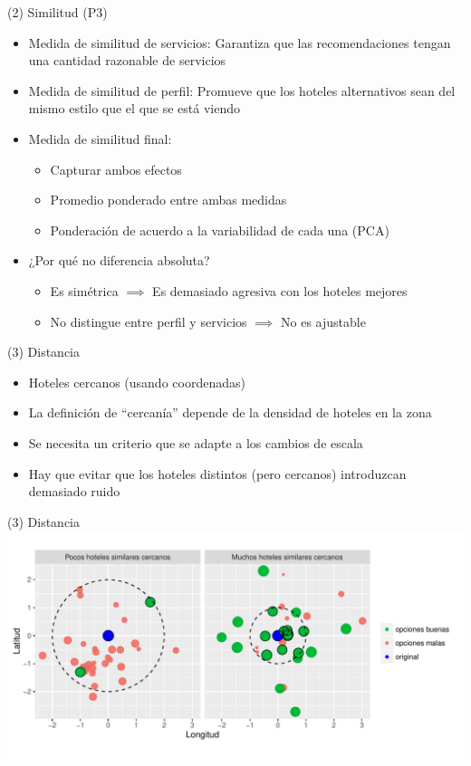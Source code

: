 \documentclass{beamer}
\begin{document}
\begin{frame}{(2) Similitud (P3)}
	\begin{itemize}%
		\item Medida de similitud de servicios: Garantiza que las recomendaciones tengan una cantidad razonable de servicios
		\item Medida de similitud de perfil: Promueve que los hoteles alternativos sean del mismo estilo que el que se está viendo
		\item Medida de similitud final:
		\begin{itemize}
			\item Capturar ambos efectos
			\item Promedio ponderado entre ambas medidas
			\item Ponderación de acuerdo a la variabilidad de cada una (PCA)
		\end{itemize}
		\item ¿Por qué no diferencia absoluta?
		\begin{itemize}
			\item Es simétrica $\implies$ Es demasiado agresiva con los hoteles mejores
			\item No distingue entre perfil y servicios $\implies$ No es ajustable
		\end{itemize}
	\end{itemize}
\end{frame}

\begin{frame}{(3) Distancia}
	\begin{itemize}%
		\item Hoteles cercanos (usando coordenadas)
		\item La definición de ``cercanía'' depende de la densidad de hoteles en la zona
		\item Se necesita un criterio que se adapte a los cambios de escala
		\item Hay que evitar que los hoteles distintos (pero cercanos) introduzcan demasiado ruido
	\end{itemize}
\end{frame}

\begin{frame}{(3) Distancia}
	\includegraphics[width=\textwidth]{imagenes/distdin.pdf}
\end{frame}
\end{document}
